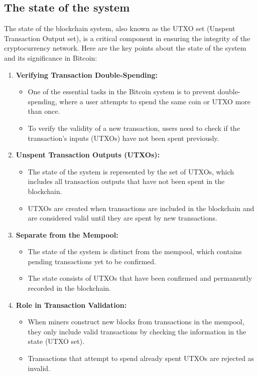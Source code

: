 \documentclass{report}
\begin{document}
\subsection{The state of the system}
The state of the blockchain system, also known as the UTXO set (Unspent Transaction Output set), is a critical component in ensuring the integrity of the cryptocurrency network. Here are the key points about the state of the system and its significance in Bitcoin:
\begin{enumerate}
	\item \textbf{Verifying Transaction Double-Spending:}
	\begin{itemize}
		\item One of the essential tasks in the Bitcoin system is to prevent double-spending, where a user attempts to spend the same coin or UTXO more than once.
		\item To verify the validity of a new transaction, users need to check if the transaction's inputs (UTXOs) have not been spent previously.
	\end{itemize}
	\item \textbf{Unspent Transaction Outputs (UTXOs):}
	\begin{itemize}
		\item The state of the system is represented by the set of UTXOs, which includes all transaction outputs that have not been spent in the blockchain.
		\item UTXOs are created when transactions are included in the blockchain and are considered valid until they are spent by new transactions.
	\end{itemize}
	\item \textbf{Separate from the Mempool:}
	\begin{itemize}
		\item The state of the system is distinct from the mempool, which contains pending transactions yet to be confirmed.
		\item The state consists of UTXOs that have been confirmed and permanently recorded in the blockchain.
	\end{itemize}
	\item \textbf{Role in Transaction Validation:}
	\begin{itemize}
		\item When miners construct new blocks from transactions in the mempool, they only include valid transactions by checking the information in the state (UTXO set).
		\item Transactions that attempt to spend already spent UTXOs are rejected as invalid.

\end{itemize}
\end{enumerate}
\end{document}

